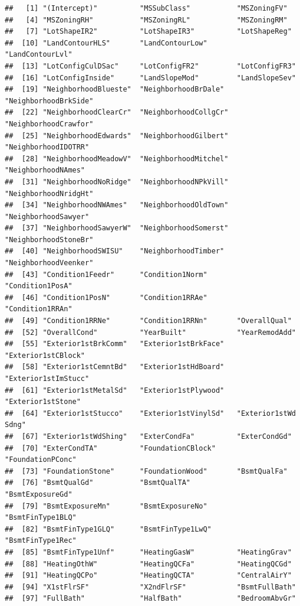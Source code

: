\documentclass[
]{article}
\begin{document}
\begin{verbatim}
##   [1] "(Intercept)"          "MSSubClass"           "MSZoningFV"          
##   [4] "MSZoningRH"           "MSZoningRL"           "MSZoningRM"          
##   [7] "LotShapeIR2"          "LotShapeIR3"          "LotShapeReg"         
##  [10] "LandContourHLS"       "LandContourLow"       "LandContourLvl"      
##  [13] "LotConfigCulDSac"     "LotConfigFR2"         "LotConfigFR3"        
##  [16] "LotConfigInside"      "LandSlopeMod"         "LandSlopeSev"        
##  [19] "NeighborhoodBlueste"  "NeighborhoodBrDale"   "NeighborhoodBrkSide" 
##  [22] "NeighborhoodClearCr"  "NeighborhoodCollgCr"  "NeighborhoodCrawfor" 
##  [25] "NeighborhoodEdwards"  "NeighborhoodGilbert"  "NeighborhoodIDOTRR"  
##  [28] "NeighborhoodMeadowV"  "NeighborhoodMitchel"  "NeighborhoodNAmes"   
##  [31] "NeighborhoodNoRidge"  "NeighborhoodNPkVill"  "NeighborhoodNridgHt" 
##  [34] "NeighborhoodNWAmes"   "NeighborhoodOldTown"  "NeighborhoodSawyer"  
##  [37] "NeighborhoodSawyerW"  "NeighborhoodSomerst"  "NeighborhoodStoneBr" 
##  [40] "NeighborhoodSWISU"    "NeighborhoodTimber"   "NeighborhoodVeenker" 
##  [43] "Condition1Feedr"      "Condition1Norm"       "Condition1PosA"      
##  [46] "Condition1PosN"       "Condition1RRAe"       "Condition1RRAn"      
##  [49] "Condition1RRNe"       "Condition1RRNn"       "OverallQual"         
##  [52] "OverallCond"          "YearBuilt"            "YearRemodAdd"        
##  [55] "Exterior1stBrkComm"   "Exterior1stBrkFace"   "Exterior1stCBlock"   
##  [58] "Exterior1stCemntBd"   "Exterior1stHdBoard"   "Exterior1stImStucc"  
##  [61] "Exterior1stMetalSd"   "Exterior1stPlywood"   "Exterior1stStone"    
##  [64] "Exterior1stStucco"    "Exterior1stVinylSd"   "Exterior1stWd Sdng"  
##  [67] "Exterior1stWdShing"   "ExterCondFa"          "ExterCondGd"         
##  [70] "ExterCondTA"          "FoundationCBlock"     "FoundationPConc"     
##  [73] "FoundationStone"      "FoundationWood"       "BsmtQualFa"          
##  [76] "BsmtQualGd"           "BsmtQualTA"           "BsmtExposureGd"      
##  [79] "BsmtExposureMn"       "BsmtExposureNo"       "BsmtFinType1BLQ"     
##  [82] "BsmtFinType1GLQ"      "BsmtFinType1LwQ"      "BsmtFinType1Rec"     
##  [85] "BsmtFinType1Unf"      "HeatingGasW"          "HeatingGrav"         
##  [88] "HeatingOthW"          "HeatingQCFa"          "HeatingQCGd"         
##  [91] "HeatingQCPo"          "HeatingQCTA"          "CentralAirY"         
##  [94] "X1stFlrSF"            "X2ndFlrSF"            "BsmtFullBath"        
##  [97] "FullBath"             "HalfBath"             "BedroomAbvGr"        

\end{verbatim}
\end{document}
